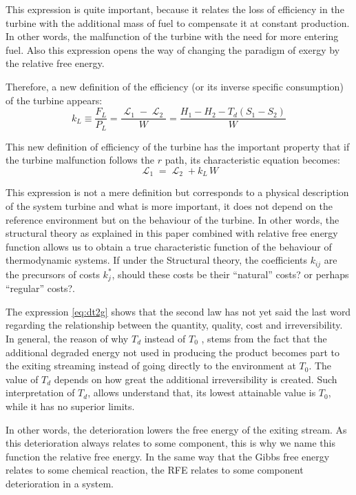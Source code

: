 \documentclass[energies,article,submit,moreauthors,pdftex]{Definitions/mdpi}
\DeclareMathOperator{\Lgdr}{\mathcal{L}}
\begin{document}
This expression is quite important, because it relates the loss of efficiency in the turbine with the additional mass of fuel to compensate it at constant production. In other words, the malfunction of the turbine with the need for more entering fuel. Also this expression opens the way of changing the paradigm of exergy by the relative free energy.

Therefore, a new definition of the efficiency (or its inverse specific consumption) of the turbine appears:
\begin{equation}
k_L \equiv \frac{F_L}{P_L} = \frac{\Lgdr_1 - \Lgdr_2}{W}=\frac{H_1-H_2-T_d \left(S_1 - S_2\right)}{W}
\label{eq:kL}
\end{equation} 

This new definition of efficiency of the turbine has the important property that if the turbine malfunction follows the $r$ path, its characteristic equation becomes:
\begin{equation}
\Lgdr_1=\Lgdr_2 + k_L\,W
\end{equation}

This expression is not a mere definition but corresponds to a physical description of the system turbine and what is more important, it does not depend on the reference environment but on the behaviour of the turbine. In other words, the structural theory as explained in this paper combined with relative free energy function allows us to obtain a true characteristic function of the behaviour of thermodynamic systems. If under the Structural theory, the coefficients $k_{ij}$ are the precursors of costs $k_j^*$, should these costs be their “natural” costs? or perhaps “regular” costs?. 

The expression \cref{eq:dt2g} shows that the second law has not yet said the last word regarding the relationship between the quantity, quality, cost and irreversibility. In general, the reason of why $T_d$ instead of $T_0$ , stems from the fact that the additional degraded energy not used in producing the product becomes part to the exiting streaming instead of going directly to the environment at $T_0$.  The value of $T_d$ depends on how great the additional irreversibility is created. Such interpretation of $T_d$, allows understand that, its lowest attainable value is $T_0$, while it has no superior limits.

In other words, the deterioration lowers the free energy of the exiting stream. As this deterioration always relates to some component, this is why we name this function the relative free energy. In the same way that the Gibbs free energy relates to some chemical reaction, the RFE relates to some component deterioration in a system.
\end{document}

